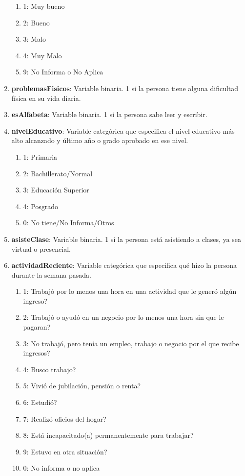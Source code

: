\documentclass[12pt,a4paper]{article}
\begin{document}
\begin{enumerate}
\begin{enumerate}
			\item 1: Muy bueno
			\item 2: Bueno
			\item 3: Malo
			\item 4: Muy Malo
			\item 9: No Informa o No Aplica
		\end{enumerate}
	\item \textbf{problemasFisicos}: Variable binaria. 1 si la persona tiene alguna dificultad física en su vida diaria.
	\item \textbf{esAlfabeta}: Variable binaria. 1 si la persona sabe leer y escribir.
	\item \textbf{nivelEducativo}: Variable categórica que especifica el nivel educativo más alto alcanzado y último año o grado aprobado en ese nivel.
		\begin{enumerate}
			\item 1: Primaria
			\item 2: Bachillerato/Normal 
			\item 3: Educación Superior
			\item 4: Posgrado 
			\item 0: No tiene/No Informa/Otros
		\end{enumerate}
	\item \textbf{asisteClase}: Variable binaria. 1 si la persona está asistiendo a clases, ya sea virtual o presencial.
	\item \textbf{actividadReciente}: Variable categórica que especifica qué hizo la persona durante la semana pasada.
		\begin{enumerate}
			\item 1: Trabajó por lo menos una hora en una actividad que le generó algún ingreso?
			\item 2: Trabajó o ayudó en un negocio por lo menos una hora sin que le pagaran?
			\item 3: No trabajó, pero tenía un empleo, trabajo o negocio por el que recibe ingresos?
			\item 4: Busco trabajo?
			\item 5: Vivió de jubilación, pensión o renta?
			\item 6: Estudió?
			\item 7: Realizó oficios del hogar?
			\item 8: Está incapacitado(a) permanentemente para trabajar?
			\item 9: Estuvo en otra situación?
			\item 0: No informa o no aplica

\end{enumerate}
\end{enumerate}
\end{document}
